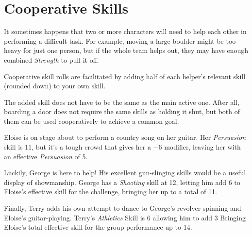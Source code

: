 \section{Cooperative Skills}
It sometimes happens that two or more characters will need to help each other in performing a difficult task.
For example, moving a large boulder might be too heavy for just one person, but if the whole team helps out, they may have enough combined \textit{Strength} to pull it off.

Cooperative skill rolls are facilitated by adding half of each helper's relevant skill (rounded down) to your own skill.

\begin{note} 
    The added skill does not have to be the same as the main active one. 
    After all, boarding a door does not require the same skills as holding it shut, but both of them can be used cooperatively to achieve a common goal.
\end{note}

\begin{example}
    Eloise is on stage about to perform a country song on her guitar.
    Her \textit{Persuasion} skill is 11, but it's a tough crowd that gives her a $-6$ modifier, leaving her with an effective \textit{Persuasion} of 5.

    Luckily, George is here to help!
    His excellent gun-slinging skills would be a useful display of showmanship.
    George has a \textit{Shooting} skill at 12, letting him add 6 to Eloise's effective skill for the challenge, bringing her up to a total of 11.
    
    Finally, Terry adds his own attempt to dance to George's revolver-spinning and Eloise's guitar-playing. 
    Terry's \textit{Athletics} Skill is 6 allowing him to add 3 Bringing Eloise's total effective skill for the group performance up to 14.
\end{example}